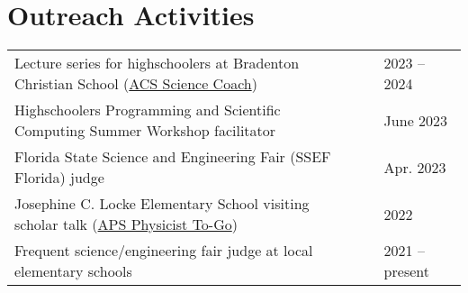 \documentclass[letterpaper,11pt]{article}
\begin{document}

\vspace{-1.5\baselineskip}

\section*{Outreach Activities}
\vspace{-1.0\baselineskip}
\begin{longtable}{@{}p{}p{} l@{}}
  Lecture series for highschoolers at Bradenton Christian School (\href{https://www.acs.org/education/outreach/science-coaches.html}{ACS Science Coach})    & & 2023 -- 2024    \\[3pt]
  Highschoolers Programming and Scientific Computing Summer Workshop facilitator                                                                            & & June 2023       \\[3pt]
  Florida State Science and Engineering Fair (SSEF Florida) judge                                                                                           & & Apr. 2023       \\[3pt]
  Josephine C. Locke Elementary School visiting scholar talk (\href{https://www.aps.org/programs/outreach/physiciststogo.cfm}{APS Physicist To-Go})         & & 2022            \\[3pt]
  Frequent science/engineering fair judge at local elementary schools                                                                                       & & 2021 -- present \\
\end{longtable}

\vspace{-0.58cm}
\begin{refsection}[talks]
 \nocite{*}
 \setlength\bibitemsep{0pt}
 \printbibliography[resetnumbers=true,type=inproceedings,title={Selected Presentations},heading=fix]
\end{refsection}
\end{document}
